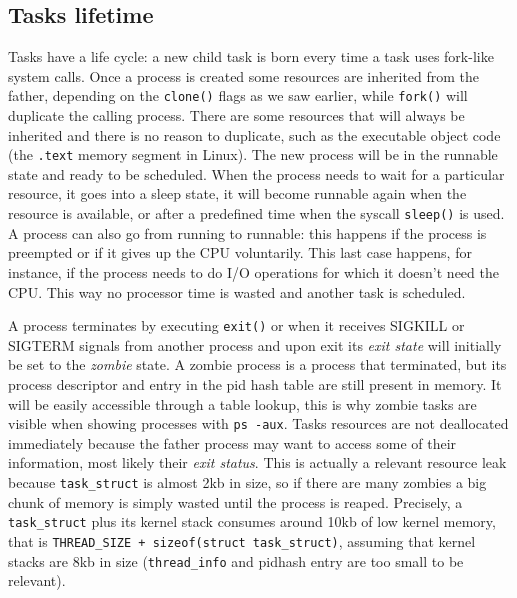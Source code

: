 \documentclass[10pt]{book}
\begin{document}
\subsection{Tasks lifetime} Tasks have a life cycle: a new child task is born every time a task uses fork-like system calls. Once a process is created some resources are inherited from the father, depending on the \verb|clone()| flags as we saw earlier, while \verb|fork()| will duplicate the calling process. There are some resources that will always be inherited and there is no reason to duplicate, such as the executable object code (the \verb|.text| memory segment in Linux). The new process will be in the runnable state and ready to be scheduled. When the process needs to wait for a particular resource, it goes into a sleep state, it will become runnable again when the resource is available, or after a predefined time when the syscall \verb|sleep()| is used. A process can also go from running to runnable: this happens if the process is preempted or if it gives up the CPU voluntarily. This last case happens, for instance, if the process needs to do I/O operations for which it doesn't need the CPU. This way no processor time is wasted and another task is scheduled.

A process terminates by executing \verb|exit()| or when it receives SIGKILL or SIGTERM signals from another process and upon exit its \textit{exit state} will initially be set to the \textit{zombie} state. A zombie process is a process that terminated, but its process descriptor and entry in the pid hash table are still present in memory. It will be easily accessible through a table lookup, this is why zombie tasks are visible when showing processes with \verb|ps -aux|. Tasks resources are not deallocated immediately because the father process may want to access some of their information, most likely their \textit{exit status}. This is actually a relevant resource leak because \verb|task_struct| is almost 2kb in size, so if there are many zombies a big chunk of memory is simply wasted until the process is reaped. Precisely, a \verb|task_struct| plus its kernel stack consumes around 10kb of low kernel memory, that is \verb|THREAD_SIZE + sizeof(struct task_struct)|, assuming that kernel stacks are 8kb in size (\verb|thread_info| and pidhash entry are too small to be relevant).
\end{document}
